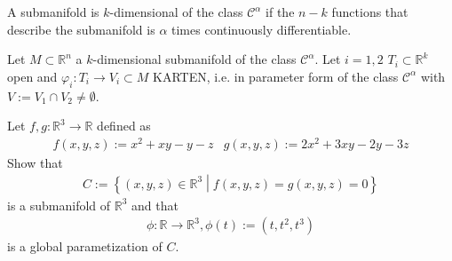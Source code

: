 %
\begin{definition}
    A submanifold is \(k\)-dimensional of the class \(\mathcal{C}^\alpha\) if the \(n-k\) functions that describe the submanifold is \(\alpha\) times continuously differentiable.
\end{definition}
%
\begin{theorem}
    Let \(M \subset \mathbb{R}^n\) a \(k\)-dimensional submanifold of the class \(\mathcal{C}^\alpha\). Let \(i = 1, 2\) \(T_i \subset \mathbb{R}^k\) open and \(\varphi_i: T_i \rightarrow V_i \subset M\) KARTEN, i.e. in parameter form of the class \(\mathcal{C}^\alpha\) with \(V:= V_1 \cap V_2 \neq \emptyset\).
\end{theorem}
%
\begin{question}
    Let \(f, g: \mathbb{R}^3 \rightarrow \mathbb{R}\) defined as
    \begin{align}
        & f(x, y, z) := x^2 + xy - y - z & g(x, y, z) := 2x^2 + 3xy - 2y - 3z &
    \end{align}
    Show that
    \begin{align}
        C := \left\{ (x, y, z) \in \mathbb{R}^3 \middle| f(x, y, z) = g(x, y, z) = 0 \right\}
    \end{align}
    is a submanifold of \(\mathbb{R}^3\) and that
    \begin{align}
        \phi: \mathbb{R} \rightarrow \mathbb{R}^3, \phi(t) := (t, t^2, t^3)
    \end{align}
    is a global parametization of \(C\).
\end{question}
